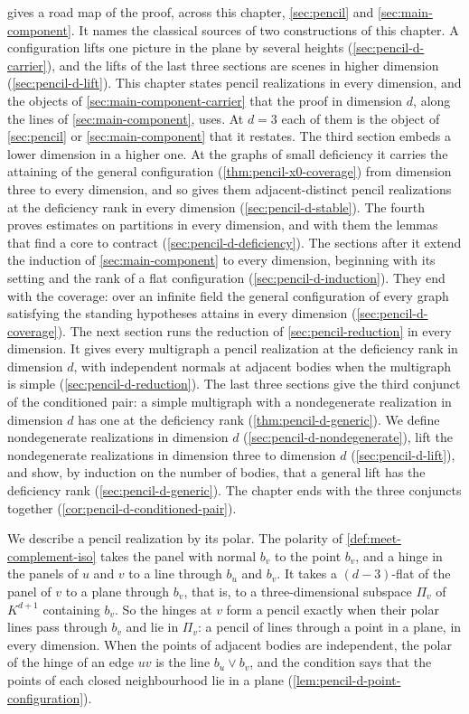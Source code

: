  gives a road map of the proof, across this
chapter, \cref{sec:pencil} and \cref{sec:main-component}. It names the
classical sources of two constructions of this chapter. A configuration
lifts one picture in the plane by several heights
(\cref{sec:pencil-d-carrier}), and the lifts of the last three sections
are scenes in higher dimension (\cref{sec:pencil-d-lift}).
This chapter states pencil realizations in every dimension, and the
objects of \cref{sec:main-component-carrier} that the proof in dimension
$d$, along the lines of \cref{sec:main-component}, uses. At $d = 3$ each
of them is the object of \cref{sec:pencil} or \cref{sec:main-component}
that it restates. The third section embeds a lower dimension in a
higher one. At the graphs of small deficiency it carries the attaining
of the general configuration (\cref{thm:pencil-x0-coverage}) from
dimension three to every dimension, and so gives them adjacent-distinct
pencil realizations at the deficiency rank in every dimension
(\cref{sec:pencil-d-stable}). The fourth proves estimates on partitions
in every dimension, and with them the lemmas that find a core to
contract (\cref{sec:pencil-d-deficiency}). The sections after it extend the
induction of \cref{sec:main-component} to every dimension, beginning
with its setting and the rank of a flat configuration
(\cref{sec:pencil-d-induction}). They end with the coverage: over an
infinite field the general configuration of every graph satisfying the
standing hypotheses attains in every dimension
(\cref{sec:pencil-d-coverage}). The next section runs the reduction of
\cref{sec:pencil-reduction} in every dimension. It gives every multigraph
a pencil realization at the deficiency rank in dimension $d$, with
independent normals at adjacent bodies when the multigraph is simple
(\cref{sec:pencil-d-reduction}). The last three sections give the third
conjunct of the conditioned pair: a simple multigraph with a nondegenerate
realization in dimension $d$ has one at the deficiency rank
(\cref{thm:pencil-d-generic}). We define nondegenerate realizations in
dimension $d$ (\cref{sec:pencil-d-nondegenerate}), lift the nondegenerate
realizations in dimension three to dimension $d$
(\cref{sec:pencil-d-lift}), and show, by induction on the number of
bodies, that a general lift has the deficiency rank
(\cref{sec:pencil-d-generic}). The chapter ends with the three conjuncts
together (\cref{cor:pencil-d-conditioned-pair}).

We describe a pencil realization by its polar. The polarity of
\cref{def:meet-complement-iso} takes the panel with normal $b_v$ to the
point $b_v$, and a hinge in the panels of $u$ and $v$ to a line through
$b_u$ and $b_v$. It takes a $(d-3)$-flat of the panel of $v$ to a plane
through $b_v$, that is, to a three-dimensional subspace $\Pi_v$ of
$K^{d+1}$ containing $b_v$. So the hinges at $v$ form a pencil exactly
when their polar lines pass through $b_v$ and lie in $\Pi_v$: a pencil of
lines through a point in a plane, in every dimension. When the points of
adjacent bodies are independent, the polar of the hinge of an edge $uv$
is the line $b_u \vee b_v$, and the condition says that the points of
each closed neighbourhood lie in a plane
(\cref{lem:pencil-d-point-configuration}).

